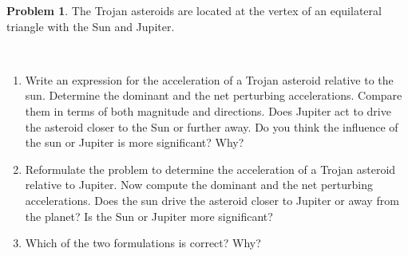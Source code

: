 \documentclass[10pt]{article}
\theoremstyle{definition}
\newtheorem{prob}{Problem}[section]
\newenvironment{subprob}%
{\renewcommand{\theenumi}{\alph{enumi}}\renewcommand{\labelenumi}{(\theenumi)}\begin{enumerate}}%
{\end{enumerate}}%
\begin{document}
\clearpage
\newpage
\begin{prob}
    The Trojan asteroids are located at the vertex of an equilateral triangle with the Sun and Jupiter.
    \begin{figure}[htbp]
        \centering
        ~
    \end{figure}

    \begin{subprob}
        \item Write an expression for the acceleration of a Trojan asteroid relative to the sun. 
            Determine the dominant and the net perturbing accelerations.
            Compare them in terms of both magnitude and directions.
            Does Jupiter act to drive the asteroid closer to the Sun or further away.
            Do you think the influence of the sun or Jupiter is more significant?
            Why?
        \item Reformulate the problem to determine the acceleration of a Trojan asteroid relative to Jupiter.
            Now compute the dominant and the net perturbing accelerations. 
            Does the sun drive the asteroid closer to Jupiter or away from the planet?
            Is the Sun or Jupiter more significant?
        \item Which of the two formulations is correct?
            Why?
    \end{subprob}
\end{prob}
\end{document}
